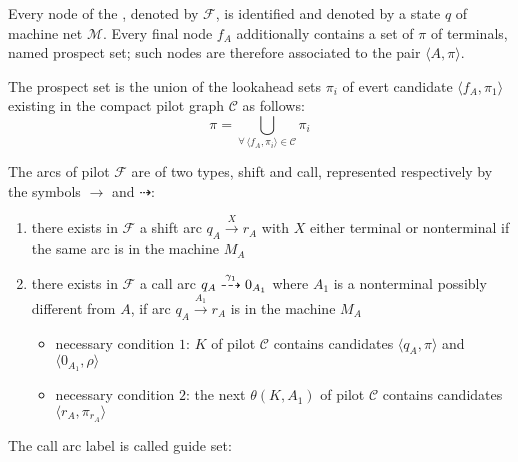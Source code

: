 \documentclass[english]{article}
\begin{document}
\bigskip
Every node of the \PCFG, denoted by \(\mathcal{F}\), is identified and denoted by a state \(q\) of machine net \(\mathcal{M}\).
Every final node \(f_A\) additionally contains a set of \(\pi\) of terminals, named prospect set;
such nodes are therefore associated to the pair \(\langle A, \pi \rangle\).

The prospect set is the union of the lookahead sets \(\pi_i\) of evert candidate \(\langle f_A, \pi_1\rangle\) existing in the compact pilot graph \(\mathcal{C}\) as follows:
\[ \pi = \bigcup_{\forall \, \langle f_A, \pi_i \rangle \in \mathcal{C}} \pi_i \]

\bigskip
The arcs of pilot \(\mathcal{F}\) are of two types, shift and call, represented respectively by the symbols \(\rightarrow\) and \(\dashrightarrow\):

\begin{enumerate}
  \item there exists in \(\mathcal{F}\) a shift arc \(q_A \xrightarrow{X} r_A\) with \(X\) either terminal or nonterminal if the same arc is in the machine \(M_A\)
  \item there exists in \(\mathcal{F}\) a call arc \(q_A \stackrel{\gamma_1}{\dashrightarrow} 0_{A_1}\) where \(A_1\) is a nonterminal possibly different from \(A\), if arc \(q_A \xrightarrow{A_1} r_A\) is in the machine \(M_A\)
        \begin{itemize}[label=\(\rightarrow\)]
          \item necessary condition \(1\): \mstate \(K\) of pilot \(\mathcal{C}\) contains candidates \(\langle q_A, \pi \rangle\) and \(\langle 0_{A_1}, \rho\rangle\)
          \item necessary condition \(2\): the next \mstate \(\theta(K, A_1)\) of pilot \(\mathcal{C}\) contains candidates \(\langle r_A, \pi_{r_A} \rangle\)
        \end{itemize}
\end{enumerate}

\bigskip
The call arc label is called guide set:
\end{document}
